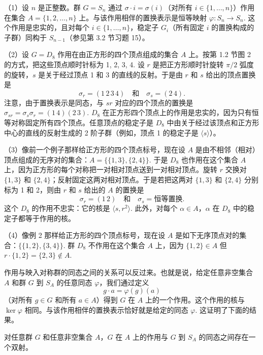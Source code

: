 \begin{example}
（1）设 \(n\) 是正整数。群 \(G = S_n\) 通过 \(\sigma \cdot i = \sigma(i)\)（对所有 \(i \in \{1, \ldots, n\}\)）作用在集合 \(A = \{1, 2, \ldots, n\}\) 上。与该作用相伴的置换表示是恒等映射 \(\varphi : S_n \to S_n\). 这个作用是忠实的，且对每个 \(i \in \{1, \ldots, n\}\)，稳定子 \(G_i\)（所有固定 \(i\) 的置换构成的子群）同构于 \(S_{n-1}\)（参见第 3.2 节习题 15）。

（2）设 \(G = D_8\) 作用在由正方形的四个顶点组成的集合 \(A\) 上。按第 1.2 节图 2 的方式，把这些顶点顺时针标为 1, 2, 3, 4. 设 \(r\) 是把正方形顺时针旋转 \(\pi/2\) 弧度的旋转，\(s\) 是关于经过顶点 1 和 3 的直线的反射。于是由 \(r\) 和 \(s\) 给出的顶点置换是
\[
\sigma_r = (1\,2\,3\,4) \quad \text{和} \quad \sigma_s = (2\,4).
\]
注意，由于置换表示是同态，与 \(sr\) 对应的四个顶点的置换是 \(\sigma_{sr} = \sigma_s\sigma_r = (1\,4)(2\,3)\). \(D_8\) 在正方形四个顶点上的作用是忠实的，因为只有恒等对称固定所有四个顶点。任意顶点的稳定子是 \(D_8\) 中由关于经过该顶点和正方形中心的直线的反射生成的 2 阶子群（例如，顶点 1 的稳定子是 \(\langle s \rangle\)）。

（3）像前一个例子那样给正方形的四个顶点标号，现在设 \(A\) 是由不相邻（相对）顶点组成的无序对的集合：\(A = \{\{1, 3\}, \{2, 4\}\}\). 于是 \(D_8\) 也作用在这个集合 \(A\) 上，因为正方形的每个对称把一对相对顶点送到一对相对顶点。旋转 \(r\) 交换对 \(\{1, 3\}\) 和 \(\{2, 4\}\)；反射固定这两对相对顶点。于是若把这两对 \(\{1, 3\}\) 和 \(\{2, 4\}\) 分别标为 1 和 2，则由 \(r\) 和 \(s\) 给出的 \(A\) 的置换是
\[
\sigma_r = (1\,2) \quad \text{和} \quad \sigma_s = \text{恒等置换}.
\]
这个 \(D_8\) 的作用不忠实：它的核是 \(\langle s, r^2 \rangle\). 此外，对每个 \(\alpha \in A\)，\(\alpha\) 在 \(D_8\) 中的稳定子都等于作用的核。

（4）像例 2 那样给正方形的四个顶点标号，现在设 \(A\) 是如下无序顶点对的集合：\(\{\{1, 2\}, \{3, 4\}\}\). 群 \(D_8\) 不作用在这个集合 \(A\) 上，因为 \(\{1, 2\} \in A\) 但 \(r \cdot \{1, 2\} = \{2, 3\} \notin A\).
\end{example}

作用与映入对称群的同态之间的关系可以反过来。也就是说，给定任意非空集合 \(A\) 和群 \(G\) 到 \(S_A\) 的任意同态 \(\varphi\)，我们通过定义
\[
g \cdot a = \varphi(g)(a)
\]
（对所有 \(g \in G\) 和所有 \(a \in A\)）得到 \(G\) 在 \(A\) 上的一个作用。这个作用的核与 \(\ker \varphi\) 相同。与该作用相伴的置换表示恰好就是给定的同态 \(\varphi\). 这证明了下面的结果。

\begin{proposition}\label{pro:4.1}
对任意群 \(G\) 和任意非空集合 \(A\)，\(G\) 在 \(A\) 上的作用与 \(G\) 到 \(S_A\) 的同态之间存在一个双射。
\end{proposition}

